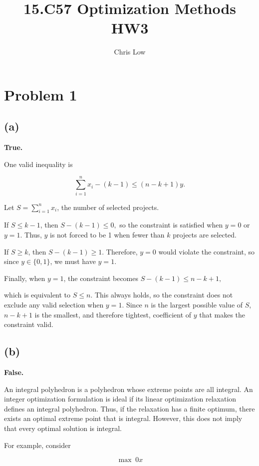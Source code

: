 \documentclass{article}
\title{15.C57 Optimization Methods HW3}
\author{Chris Low}
\date{} %
\begin{document}
\maketitle

\section*{Problem 1}

\subsection*{(a)}

\textbf{True.}

One valid inequality is

$$
\sum_{i=1}^n x_i - (k-1) \leq (n-k+1)y.
$$

Let $S = \sum_{i=1}^n x_i$, the number of selected projects.

If $S \leq k-1$, then $
S-(k-1) \leq 0,
$ 
so the constraint is satisfied when $y=0$ or $y=1$. Thus, $y$ is not forced to be 1 when fewer than $k$ projects are selected.

If $S \geq k$, then $
S-(k-1) \geq 1.
$
Therefore, $y=0$ would violate the constraint, so since $y \in \{0,1\}$, we must have $y=1$.

Finally, when $y=1$, the constraint becomes $
S-(k-1) \leq n-k+1,
$

which is equivalent to $
S \leq n.
$ This always holds, so the constraint does not exclude any valid selection when $y=1$. Since $n$ is the largest possible value of $S$, $n-k+1$ is the smallest, and therefore tightest, coefficient of $y$ that makes the constraint valid.

\vspace{5mm}
\subsection*{(b)}

\textbf{False.}

An integral polyhedron is a polyhedron whose extreme points are all integral. An integer optimization formulation is ideal if its linear optimization relaxation defines an integral polyhedron. Thus, if the relaxation has a finite optimum, there exists an optimal extreme point that is integral. However, this does not imply that every optimal solution is integral.

For example, consider

$$
\max \; 0x
$$
\end{document}
